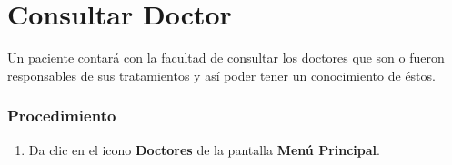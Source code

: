 \section{Consultar Doctor}

Un paciente contará con la facultad de consultar los doctores que son o fueron
responsables de sus tratamientos y así poder tener un conocimiento de éstos.

\subsubsection{Procedimiento}
\begin{enumerate}
	
	\item Da clic en el icono \textbf{Doctores} de la pantalla \textbf{Menú Principal}.


\end{enumerate}
